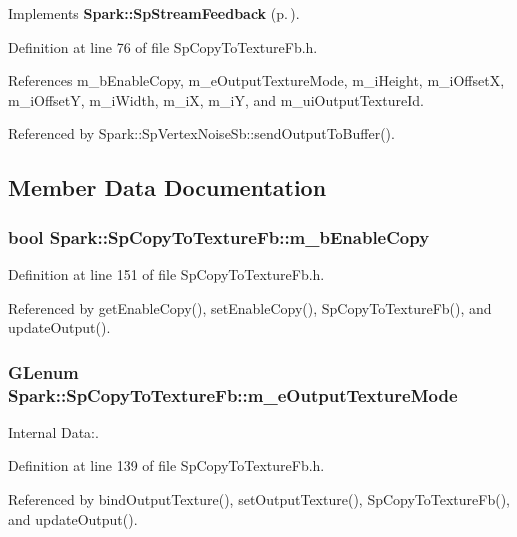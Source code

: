 Implements {\bf Spark::Sp\-Stream\-Feedback} {\rm (p.\,\pageref{classSpark_1_1SpStreamFeedback_a1})}.

Definition at line 76 of file Sp\-Copy\-To\-Texture\-Fb.h.

References m\_\-b\-Enable\-Copy, m\_\-e\-Output\-Texture\-Mode, m\_\-i\-Height, m\_\-i\-Offset\-X, m\_\-i\-Offset\-Y, m\_\-i\-Width, m\_\-i\-X, m\_\-i\-Y, and m\_\-ui\-Output\-Texture\-Id.

Referenced by Spark::Sp\-Vertex\-Noise\-Sb::send\-Output\-To\-Buffer().

\subsection{Member Data Documentation}
\subsubsection{\setlength{\rightskip}{0pt plus 5cm}bool {\bf Spark::Sp\-Copy\-To\-Texture\-Fb::m\_\-b\-Enable\-Copy}\hspace{0.3cm}{\tt  [protected]}}\label{classSpark_1_1SpCopyToTextureFb_p9}


Definition at line 151 of file Sp\-Copy\-To\-Texture\-Fb.h.

Referenced by get\-Enable\-Copy(), set\-Enable\-Copy(), Sp\-Copy\-To\-Texture\-Fb(), and update\-Output().
\subsubsection{\setlength{\rightskip}{0pt plus 5cm}GLenum {\bf Spark::Sp\-Copy\-To\-Texture\-Fb::m\_\-e\-Output\-Texture\-Mode}\hspace{0.3cm}{\tt  [protected]}}\label{classSpark_1_1SpCopyToTextureFb_p0}


Internal Data:. 

Definition at line 139 of file Sp\-Copy\-To\-Texture\-Fb.h.

Referenced by bind\-Output\-Texture(), set\-Output\-Texture(), Sp\-Copy\-To\-Texture\-Fb(), and update\-Output().
